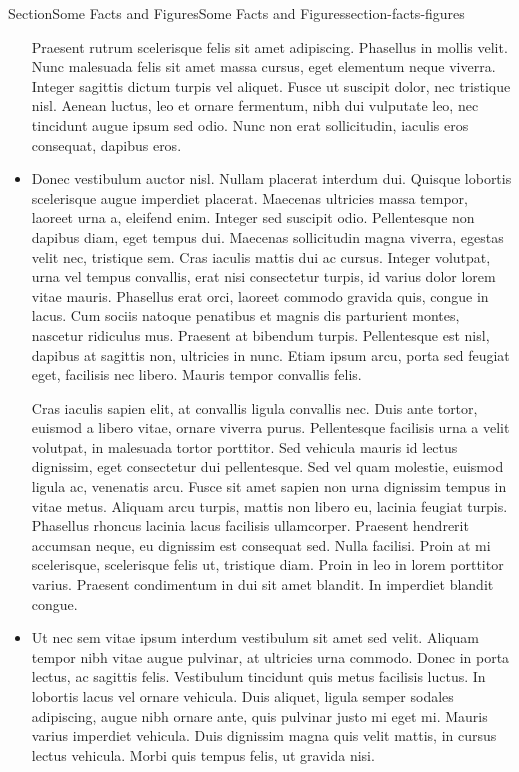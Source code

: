 \documentclass[twoside,10pt,]{article}
\numberwithin{equation}{section}
\begin{document}
\begin{sectionptx}{Section}{Some Facts and Figures}{}{Some Facts and Figures}{}{}{section-facts-figures}
\begin{multicols}{2}
\begin{itemize}[label=\textbullet]
\par
Praesent rutrum scelerisque felis sit amet adipiscing. Phasellus in mollis velit. Nunc malesuada felis sit amet massa cursus, eget elementum neque viverra. Integer sagittis dictum turpis vel aliquet. Fusce ut suscipit dolor, nec tristique nisl. Aenean luctus, leo et ornare fermentum, nibh dui vulputate leo, nec tincidunt augue ipsum sed odio. Nunc non erat sollicitudin, iaculis eros consequat, dapibus eros.%
\item{}Donec vestibulum auctor nisl. Nullam placerat interdum dui. Quisque lobortis scelerisque augue imperdiet placerat. Maecenas ultricies massa tempor, laoreet urna a, eleifend enim. Integer sed suscipit odio. Pellentesque non dapibus diam, eget tempus dui. Maecenas sollicitudin magna viverra, egestas velit nec, tristique sem. Cras iaculis mattis dui ac cursus. Integer volutpat, urna vel tempus convallis, erat nisi consectetur turpis, id varius dolor lorem vitae mauris. Phasellus erat orci, laoreet commodo gravida quis, congue in lacus. Cum sociis natoque penatibus et magnis dis parturient montes, nascetur ridiculus mus. Praesent at bibendum turpis. Pellentesque est nisl, dapibus at sagittis non, ultricies in nunc. Etiam ipsum arcu, porta sed feugiat eget, facilisis nec libero. Mauris tempor convallis felis.%
\par
Cras iaculis sapien elit, at convallis ligula convallis nec. Duis ante tortor, euismod a libero vitae, ornare viverra purus. Pellentesque facilisis urna a velit volutpat, in malesuada tortor porttitor. Sed vehicula mauris id lectus dignissim, eget consectetur dui pellentesque. Sed vel quam molestie, euismod ligula ac, venenatis arcu. Fusce sit amet sapien non urna dignissim tempus in vitae metus. Aliquam arcu turpis, mattis non libero eu, lacinia feugiat turpis. Phasellus rhoncus lacinia lacus facilisis ullamcorper. Praesent hendrerit accumsan neque, eu dignissim est consequat sed. Nulla facilisi. Proin at mi scelerisque, scelerisque felis ut, tristique diam. Proin in leo in lorem porttitor varius. Praesent condimentum in dui sit amet blandit. In imperdiet blandit congue.%
\item{}Ut nec sem vitae ipsum interdum vestibulum sit amet sed velit. Aliquam tempor nibh vitae augue pulvinar, at ultricies urna commodo. Donec in porta lectus, ac sagittis felis. Vestibulum tincidunt quis metus facilisis luctus. In lobortis lacus vel ornare vehicula. Duis aliquet, ligula semper sodales adipiscing, augue nibh ornare ante, quis pulvinar justo mi eget mi. Mauris varius imperdiet vehicula. Duis dignissim magna quis velit mattis, in cursus lectus vehicula. Morbi quis tempus felis, ut gravida nisi.%

\end{itemize}
\end{multicols}
\end{sectionptx}
\end{document}
